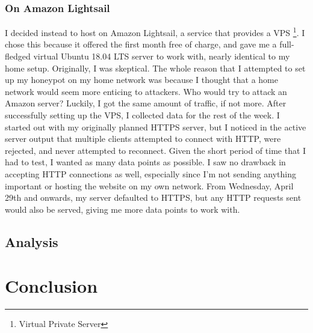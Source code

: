 \documentclass[12pt]{article}
\begin{document}
\subsubsection{On Amazon Lightsail}
I decided instead to host on Amazon Lightsail, a service that provides a VPS \footnote{Virtual Private Server}.
I chose this because it offered the first month free of charge, and gave me a full-fledged virtual Ubuntu 18.04 LTS server to work with, nearly identical to my home setup.
Originally, I was skeptical.
The whole reason that I attempted to set up my honeypot on my home network was because I thought that a home network would seem more enticing to attackers.
Who would try to attack an Amazon server?
Luckily, I got the same amount of traffic, if not more.
After successfully setting up the VPS, I collected data for the rest of the week.
I started out with my originally planned HTTPS server, but I noticed in the active server output that multiple clients attempted to connect with HTTP, were rejected, and never attempted to reconnect.
Given the short period of time that I had to test, I wanted as many data points as possible.
I saw no drawback in accepting HTTP connections as well, especially since I'm not sending anything important or hosting the website on my own network.
From Wednesday, April 29th and onwards, my server defaulted to HTTPS, but any HTTP requests sent would also be served, giving me more data points to work with.


\subsection{Analysis}




\section{Conclusion}
\clearpage

\nocite{cohen_honeypot}
\printbibliography
\end{document}

